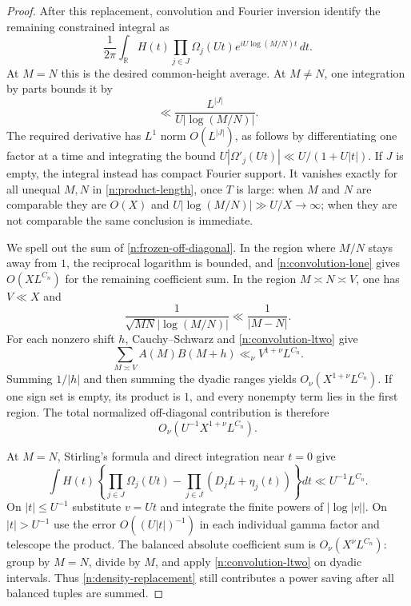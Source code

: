 \documentclass[11pt]{article}
\numberwithin{equation}{section}
\theoremstyle{remark}
\begin{document}
\begin{proof}
After this replacement, convolution and Fourier inversion identify
the remaining constrained integral as
\begin{equation}\label{n:frozen-convolution}
 \frac1{2\pi}\int_{\mathbb R}H(t)
       \prod_{j\in J}\Omega_j(Ut)
       e^{iU\log(M/N)t}\,dt.
\end{equation}
At $M=N$ this is the desired common-height average. At $M\ne N$,
one integration by parts bounds it by
\begin{equation}\label{n:frozen-off-diagonal}
 \ll\frac{L^{|J|}}{U|\log(M/N)|}.
\end{equation}
The required derivative has $L^1$ norm $O(L^{|J|})$, as follows
by differentiating one factor at a time and integrating the bound
$U|\Omega'_j(Ut)|\ll U/(1+U|t|)$.
If $J$ is empty, the integral instead has compact Fourier support.
It vanishes exactly for all unequal $M,N$ in
\eqref{n:product-length}, once $T$ is large: when $M$ and $N$ are
comparable they are $O(X)$ and $U|\log(M/N)|\gg U/X\to\infty$;
when they are not comparable the same conclusion is immediate.

We spell out the sum of \eqref{n:frozen-off-diagonal}. In the region
where $M/N$ stays away from $1$, the reciprocal logarithm is bounded,
and \eqref{n:convolution-lone} gives $O(XL^{C_n})$ for the remaining
coefficient sum. In the region $M\asymp N\asymp V$, one has $V\ll X$
and
\[
 \frac1{\sqrt{MN}|\log(M/N)|}\ll\frac1{|M-N|}.
\]
For each nonzero shift $h$, Cauchy--Schwarz and
\eqref{n:convolution-ltwo} give
\[
 \sum_{M\asymp V}A(M)B(M+h)\ll_\nu V^{1+\nu}L^{C_n}.
\]
Summing $1/|h|$ and then summing the
dyadic ranges yields $O_\nu(X^{1+\nu}L^{C_n})$. If one sign set is
empty, its product is $1$, and every nonempty term lies in the first
region. The total normalized off-diagonal contribution is therefore
\begin{equation}\label{n:total-off-diagonal}
 O_\nu\left(U^{-1}X^{1+\nu}L^{C_n}\right).
\end{equation}

At $M=N$, Stirling's formula and direct integration near $t=0$ give
\begin{equation}\label{n:density-replacement}
 \int H(t)\left\{\prod_{j\in J}\Omega_j(Ut)
       -\prod_{j\in J}(D_jL+\eta_j(t))\right\}dt
       \ll U^{-1}L^{C_n}.
\end{equation}
On $|t|\le U^{-1}$ substitute $v=Ut$ and integrate the finite powers
of $|\log|v||$. On $|t|>U^{-1}$ use the error
$O((U|t|)^{-1})$ in each individual gamma factor and telescope the
product. The balanced absolute coefficient sum is
$O_\nu(X^\nu L^{C_n})$: group by $M=N$, divide by $M$, and apply
\eqref{n:convolution-ltwo} on dyadic intervals. Thus
\eqref{n:density-replacement} still contributes a power saving after
all balanced tuples are summed.


\end{proof}
\end{document}
